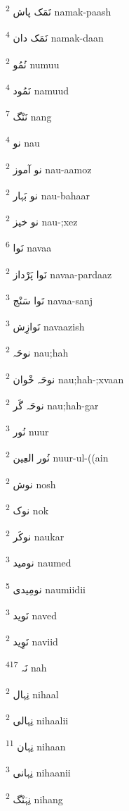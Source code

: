 \documentclass[12pt]{article}
\begin{document}
\begin{RTL}
\begin{multicols}{5}
{\ur نَمَک پاش}   \textsuperscript{2} namak-paash

{\ur نَمَک دان}   \textsuperscript{4} namak-daan

{\ur نُمُو}   \textsuperscript{2} numuu

{\ur نَمُود}   \textsuperscript{4} namuud

{\ur نَنْگ}   \textsuperscript{7} nang

{\ur نو}   \textsuperscript{4} nau

{\ur نو آموز}   \textsuperscript{2} nau-aamoz

{\ur نو بَہار}   \textsuperscript{2} nau-bahaar

{\ur نو خیز}   \textsuperscript{2} nau-;xez

{\ur نَوا}   \textsuperscript{6} navaa

{\ur نَوا پَرْداز}   \textsuperscript{2} navaa-pardaaz

{\ur نَوا سَنْج}   \textsuperscript{3} navaa-sanj

{\ur نَوازِش}   \textsuperscript{3} navaazish

{\ur نوحَہ}   \textsuperscript{2} nau;hah

{\ur نوحَہ خْوان}   \textsuperscript{2} nau;hah-;xvaan

{\ur نوحَہ گَر}   \textsuperscript{2} nau;hah-gar

{\ur نُور}   \textsuperscript{3} nuur

{\ur نُور العِین}   \textsuperscript{2} nuur-ul-((ain

{\ur نوش}   \textsuperscript{2} nosh

{\ur نوک}   \textsuperscript{2} nok

{\ur نوکَر}   \textsuperscript{2} naukar

{\ur نومید}   \textsuperscript{3} naumed

{\ur نومِیدی}   \textsuperscript{5} naumiidii

{\ur نَوید}   \textsuperscript{3} naved

{\ur نَوِید}   \textsuperscript{2} naviid

{\ur نَہ}   \textsuperscript{417} nah

{\ur نِہال}   \textsuperscript{2} nihaal

{\ur نِہالی}   \textsuperscript{2} nihaalii

{\ur نِہان}   \textsuperscript{11} nihaan

{\ur نِہانی}   \textsuperscript{3} nihaanii

{\ur نِہَنْگ}   \textsuperscript{2} nihang


\end{multicols}
\end{RTL}
\end{document}
